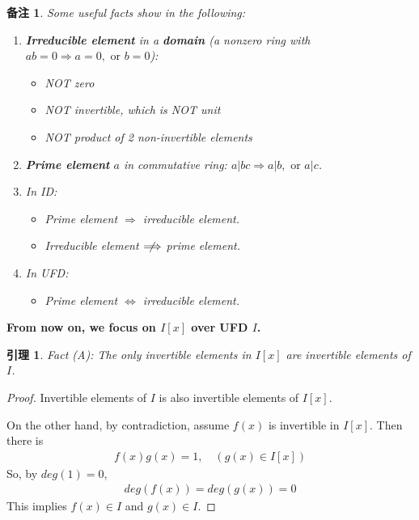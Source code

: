 \documentclass[utf8]{ctexbook}
\newtheorem{memo}{备注}[section]
\newtheorem{lemma}{引理}[section]
\begin{document}
\begin{memo}
Some useful facts show in the following:
\begin{enumerate}
\item{\textbf{Irreducible element} in a \textbf{domain} (a nonzero ring with $ab = 0 \Longrightarrow a=0, \mbox{ or } b =0$):
\begin{itemize}
\item{NOT zero}
\item{NOT invertible, which is NOT unit}
\item{NOT product of 2 non-invertible elements}
\end{itemize}
}
\item{\textbf{Prime element} $a$ in commutative ring: $ a | bc \Longrightarrow a | b, \mbox{ or } a | c $.
}
\item{In ID: 
\begin{itemize}
\item{Prime element $\Longrightarrow$ irreducible element.}
\item{Irreducible element $ \centernot \Longrightarrow$ prime element.}
\end{itemize}
}
\item{In UFD:
\begin{itemize}
\item{Prime element $\iff$ irreducible element.}
\end{itemize}
}
\end{enumerate}

\end{memo}


\textbf{From now on, we focus on $I[x]$ over UFD $I$.}


\begin{lemma}\label{lemma_poly_ring_factor_fact_A}
Fact (A): The only invertible elements in $I[x]$ are invertible elements of $I$.
\end{lemma}

\begin{proof}
Invertible elements of $I$ is also invertible elements of $I[x]$.

On the other hand, by contradiction, assume $f(x)$ is invertible in $I[x]$. Then there is 
\begin{align*}
f(x) g(x) = 1 , \quad (g(x) \in I[x])
\end{align*}
So, by $deg(1) = 0$,
\begin{align*}
deg(f(x)) = deg(g(x)) = 0
\end{align*}
This implies $f(x) \in I$ and $g(x) \in I$.

\end{proof}
\end{document}
